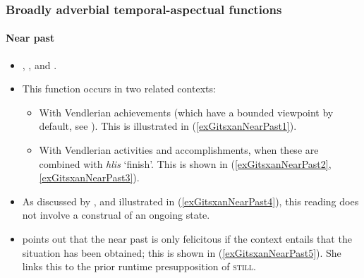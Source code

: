 \subsubsection{Broadly adverbial temporal-aspectual functions}
\paragraph{Near past}\label{appendixGitsxanNearPast}
\begin{itemize}
	\item \textcite{Aonuki2021}, \textcite[140–141]{Hunt1993}, and \textcite[445–447]{Tarpent1987}.
	\item This function occurs in two related contexts:
	\begin{itemize}
		\item With Vendlerian achievements (which have a bounded viewpoint by default, see \cite{JohansdottirMatthewson2007}). This is illustrated in (\ref{exGitsxanNearPast1}).
		\item With Vendlerian activities and accomplishments, when these are combined with \textit{hlis} \lq finish'. This is shown in (\ref{exGitsxanNearPast2}, \ref{exGitsxanNearPast3}).
	\end{itemize}	
	\item As discussed by \textcite{Aonuki2021}, and illustrated in  (\ref{exGitsxanNearPast4}), this reading does not involve a construal of an ongoing state.
	\item \textcite{Aonuki2021} points out that the near past is only felicitous if the context entails that the situation has been obtained; this is shown in (\ref{exGitsxanNearPast5}). She links this to the prior runtime presupposition of \textsc{still}.
\end{itemize}

